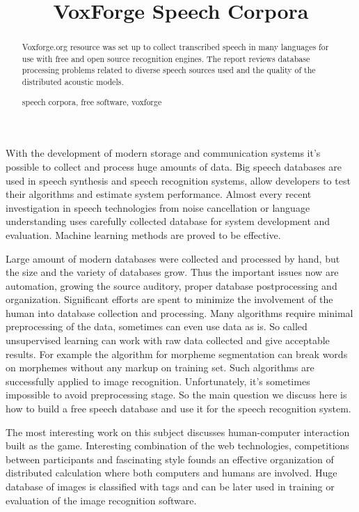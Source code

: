 \documentclass[runningheads]{llncs}
\newcommand{\keywords}[1]{\par\addvspace\baselineskip\noindent\keywordname\enspace\ignorespaces#1}
\begin{document}
\mainmatter

\title{VoxForge Speech Corpora}

\maketitle

\begin{abstract}
Voxforge.org resource was set up to collect transcribed speech in many
languages for use with free and open source recognition engines. The
report reviews database processing problems related to diverse speech
sources used and the quality of the distributed acoustic models.
\keywords{speech corpora, free software, voxforge}
\end{abstract}

With the development of modern storage and communication systems it's
possible to collect and process huge amounts of data. Big speech
databases are used in speech synthesis and speech recognition systems,
allow developers to test their algorithms and estimate system
performance. Almost every recent investigation in speech technologies
from noise cancellation or language understanding uses carefully collected
database for system development and evaluation. Machine learning methods
are proved to be effective.

Large amount of modern databases were collected and processed by hand, 
but the size and the variety of databases grow. Thus the important
issues now are automation, growing the source auditory, proper
database postprocessing and organization. Significant efforts are spent
to minimize the involvement of the human into  database collection and
processing. Many algorithms require minimal preprocessing of the data,
sometimes can even use data as is. So called unsupervised learning can
work with raw data collected and give acceptable results. For example
the algorithm for morpheme segmentation \cite{creutz} can break words on
morphemes without any markup on training set. Such algorithms are
successfully applied to image recognition. Unfortunately, it's sometimes
impossible to avoid preprocessing stage. So the main question we discuss
here is how to build a free speech database and use it for the speech
recognition system.

The most interesting work on this subject \cite{ahn} discusses
human-computer interaction built as the game. Interesting combination of
the web technologies, competitions between participants and fascinating style
founds an effective organization of distributed calculation where
both computers and humans are involved. Huge database of images
is classified with tags and can be later used in training or evaluation
of the image recognition software.
\end{document}
